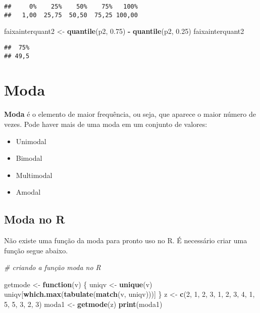 \documentclass[
]{book}
\newenvironment{Shaded}{\begin{snugshade}}{\end{snugshade}}
\newcommand{\CommentTok}[1]{\textcolor[rgb]{0.56,0.35,0.01}{\textit{#1}}}
\newcommand{\ControlFlowTok}[1]{\textcolor[rgb]{0.13,0.29,0.53}{\textbf{#1}}}
\newcommand{\DecValTok}[1]{\textcolor[rgb]{0.00,0.00,0.81}{#1}}
\newcommand{\FloatTok}[1]{\textcolor[rgb]{0.00,0.00,0.81}{#1}}
\newcommand{\KeywordTok}[1]{\textcolor[rgb]{0.13,0.29,0.53}{\textbf{#1}}}
\newcommand{\NormalTok}[1]{#1}
\newcommand{\OperatorTok}[1]{\textcolor[rgb]{0.81,0.36,0.00}{\textbf{#1}}}
\newcommand{\StringTok}[1]{\textcolor[rgb]{0.31,0.60,0.02}{#1}}
\providecommand{\tightlist}{%
  \setlength{\itemsep}{0pt}\setlength{\parskip}{0pt}}
\begin{document}
\begin{verbatim}
##     0%    25%    50%    75%   100% 
##   1,00  25,75  50,50  75,25 100,00
\end{verbatim}

\begin{Shaded}
\begin{Highlighting}[]
\NormalTok{faixainterquant2 <-}\StringTok{ }\KeywordTok{quantile}\NormalTok{(p2, }\FloatTok{0.75}\NormalTok{) }\OperatorTok{-}\StringTok{ }\KeywordTok{quantile}\NormalTok{(p2, }
    \FloatTok{0.25}\NormalTok{)}
\NormalTok{faixainterquant2}
\end{Highlighting}
\end{Shaded}

\begin{verbatim}
##  75% 
## 49,5
\end{verbatim}

\hypertarget{moda}{%
\section{Moda}\label{moda}}

\textbf{Moda} é o elemento de maior frequência, ou seja, que aparece o maior número de vezes. Pode haver mais de uma moda em um conjunto de valores:

\begin{itemize}
\tightlist
\item
  Unimodal
\item
  Bimodal
\item
  Multimodal
\item
  Amodal
\end{itemize}

\hypertarget{moda-no-r}{%
\subsection{Moda no R}\label{moda-no-r}}

Não existe uma função da moda para pronto uso no R. É necessário criar uma função
segue abaixo.

\begin{Shaded}
\begin{Highlighting}[]
\CommentTok{# criando a função moda no R}

\NormalTok{getmode <-}\StringTok{ }\ControlFlowTok{function}\NormalTok{(v) \{}
\NormalTok{    uniqv <-}\StringTok{ }\KeywordTok{unique}\NormalTok{(v)}
\NormalTok{    uniqv[}\KeywordTok{which.max}\NormalTok{(}\KeywordTok{tabulate}\NormalTok{(}\KeywordTok{match}\NormalTok{(v, uniqv)))]}
\NormalTok{\}}
\NormalTok{z <-}\StringTok{ }\KeywordTok{c}\NormalTok{(}\DecValTok{2}\NormalTok{, }\DecValTok{1}\NormalTok{, }\DecValTok{2}\NormalTok{, }\DecValTok{3}\NormalTok{, }\DecValTok{1}\NormalTok{, }\DecValTok{2}\NormalTok{, }\DecValTok{3}\NormalTok{, }\DecValTok{4}\NormalTok{, }\DecValTok{1}\NormalTok{, }\DecValTok{5}\NormalTok{, }\DecValTok{5}\NormalTok{, }\DecValTok{3}\NormalTok{, }\DecValTok{2}\NormalTok{, }\DecValTok{3}\NormalTok{)}
\NormalTok{moda1 <-}\StringTok{ }\KeywordTok{getmode}\NormalTok{(z)}
\KeywordTok{print}\NormalTok{(moda1)}
\end{Highlighting}
\end{Shaded}
\end{document}
